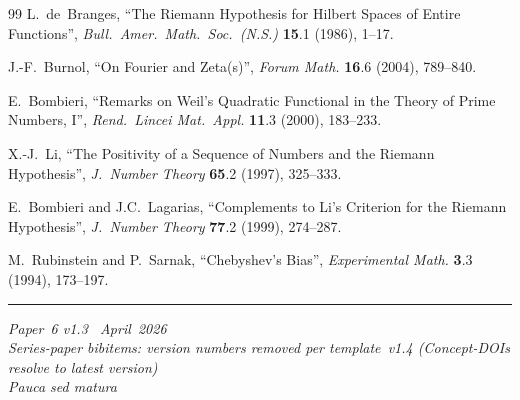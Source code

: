 \documentclass[11pt]{article}
\begin{document}
\begin{thebibliography}{99}
L.~de~Branges,
``The Riemann Hypothesis for Hilbert Spaces of Entire Functions'',
\emph{Bull.\ Amer.\ Math.\ Soc.\ (N.S.)} \textbf{15}.1 (1986),
1--17.

J.-F.~Burnol,
``On Fourier and Zeta(s)'',
\emph{Forum Math.} \textbf{16}.6 (2004), 789--840.

E.~Bombieri,
``Remarks on Weil's Quadratic Functional in the Theory of Prime
Numbers, I'',
\emph{Rend.\ Lincei Mat.\ Appl.} \textbf{11}.3 (2000), 183--233.

X.-J.~Li,
``The Positivity of a Sequence of Numbers and the Riemann
Hypothesis'',
\emph{J.\ Number Theory} \textbf{65}.2 (1997), 325--333.

E.~Bombieri and J.C.~Lagarias,
``Complements to Li's Criterion for the Riemann Hypothesis'',
\emph{J.\ Number Theory} \textbf{77}.2 (1999), 274--287.

M.~Rubinstein and P.~Sarnak,
``Chebyshev's Bias'',
\emph{Experimental Math.} \textbf{3}.3 (1994), 173--197.

\end{thebibliography}

\bigskip\noindent\rule{\linewidth}{0.4pt}\par\smallskip
\noindent\small
\emph{Paper~6 v1.3 \textperiodcentered\ April~2026}\\
\emph{Series-paper bibitems: version numbers removed per
template~v1.4 (Concept-DOIs resolve to latest version)}\\
\emph{Pauca sed matura}
\end{document}
